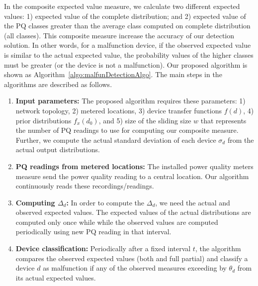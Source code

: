 In the composite expected value measure, we calculate two different expected values: 1) expected value of the complete distribution; and 2) expected value of the PQ classes greater than the average class computed on complete distribution (all classes). This composite measure increase the accuracy of our detection solution. In other words, for a malfunction device, if the observed expected value is similar to the actual expected value, the probability values of the higher classes must be greater (or the device is not a malfunction). Our proposed algorithm is shown as Algorithm~\ref{algo:malfunDetectionAlgo}. The main steps in the algorithms are described as follows.

\begin{enumerate}
\item \textbf{Input parameters:} The proposed algorithm requires these parameters: 1) network topology, 2) metered locations, 3) device transfer functions $f(d)$, 4) prior distributions $f_x(d_0)$, and 5) size of the sliding size $w$ that represents the number of PQ readings to use for computing our composite measure. Further, we compute the actual standard deviation of each device $\sigma_d$ from the actual output distributions.
\item \textbf{PQ readings from metered locations:} The installed power quality meters measure send the power quality reading to a central location. Our algorithm continuously reads these recordings/readings.
\item \textbf{Computing $\Delta_d$:} In order to compute the $\Delta_d$, we need the actual and observed expected values. The expected values of the actual distributions are computed only once while while the observed values are computed periodically using new PQ reading in that interval.
\item \textbf{Device classification:} Periodically after a fixed interval $t$, the algorithm compares the observed expected values (both and full partial) and classify a device $d$ as malfunction if any of the observed measures exceeding by $\theta_d$ from its actual expected values.
\end{enumerate}



